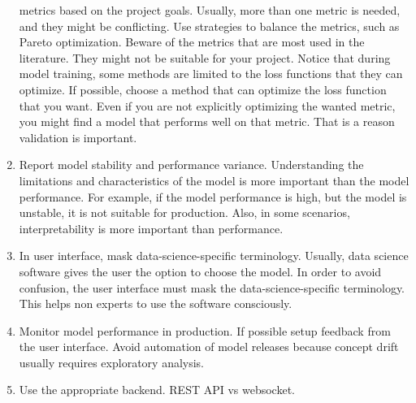 \begin{enumerate}
    metrics based on the project goals.  Usually, more than one metric is needed, and they
    might be conflicting.  Use strategies to balance the metrics, such as Pareto
    optimization.  Beware of the metrics that are most used in the literature.  They might not
    be suitable for your project.  Notice that during model training, some methods are
    limited to the loss functions that they can optimize.  If possible, choose a method
    that can optimize the loss function that you want.  Even if you are not explicitly
    optimizing the wanted metric, you might find a model that performs well on that metric.
    That is a reason validation is important.
  \item Report model stability and performance variance.  Understanding the limitations
    and characteristics of the model is more important than the model performance.  For
    example, if the model performance is high, but the model is unstable, it is not
    suitable for production.  Also, in some scenarios, interpretability is more important than
    performance.
  \item In user interface, mask data-science-specific terminology.  Usually, data science
    software gives the user the option to choose the model.  In order to avoid confusion,
    the user interface must mask the data-science-specific terminology.  This helps non
    experts to use the software consciously.
  \item Monitor model performance in production.  If possible setup feedback from the user
    interface.  Avoid automation of model releases because concept drift usually requires
    exploratory analysis.
  \item Use the appropriate backend.  REST API vs websocket.
\end{enumerate}
